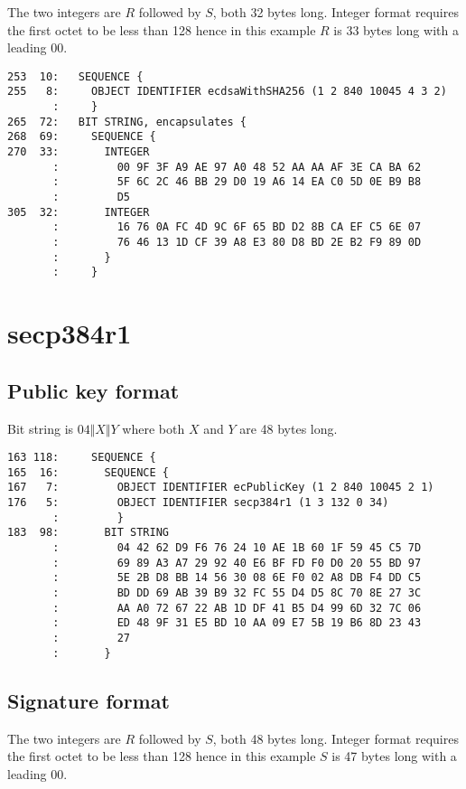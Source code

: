 \documentclass[12pt]{article}
\begin{document}
\noindent
The two integers are $R$ followed by $S$, both 32 bytes long.
Integer format requires the first octet to be less than 128
hence in this example $R$ is 33 bytes long with a leading 00.

\begin{verbatim}
253  10:   SEQUENCE {
255   8:     OBJECT IDENTIFIER ecdsaWithSHA256 (1 2 840 10045 4 3 2)
       :     }
265  72:   BIT STRING, encapsulates {
268  69:     SEQUENCE {
270  33:       INTEGER
       :         00 9F 3F A9 AE 97 A0 48 52 AA AA AF 3E CA BA 62
       :         5F 6C 2C 46 BB 29 D0 19 A6 14 EA C0 5D 0E B9 B8
       :         D5
305  32:       INTEGER
       :         16 76 0A FC 4D 9C 6F 65 BD D2 8B CA EF C5 6E 07
       :         76 46 13 1D CF 39 A8 E3 80 D8 BD 2E B2 F9 89 0D
       :       }
       :     }
\end{verbatim}

\newpage
\section{secp384r1}

\subsection{Public key format}

\noindent
Bit string is $04\Vert X\Vert Y$ where both $X$ and $Y$ are 48 bytes long.

\begin{verbatim}
163 118:     SEQUENCE {
165  16:       SEQUENCE {
167   7:         OBJECT IDENTIFIER ecPublicKey (1 2 840 10045 2 1)
176   5:         OBJECT IDENTIFIER secp384r1 (1 3 132 0 34)
       :         }
183  98:       BIT STRING
       :         04 42 62 D9 F6 76 24 10 AE 1B 60 1F 59 45 C5 7D
       :         69 89 A3 A7 29 92 40 E6 BF FD F0 D0 20 55 BD 97
       :         5E 2B D8 BB 14 56 30 08 6E F0 02 A8 DB F4 DD C5
       :         BD DD 69 AB 39 B9 32 FC 55 D4 D5 8C 70 8E 27 3C
       :         AA A0 72 67 22 AB 1D DF 41 B5 D4 99 6D 32 7C 06
       :         ED 48 9F 31 E5 BD 10 AA 09 E7 5B 19 B6 8D 23 43
       :         27
       :       }
\end{verbatim}

\subsection{Signature format}

\noindent
The two integers are $R$ followed by $S$, both 48 bytes long.
Integer format requires the first octet to be less than 128
hence in this example $S$ is 47 bytes long with a leading 00.
\end{document}
